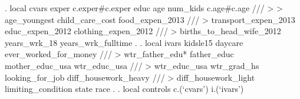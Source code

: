 . local cvars exper c.exper\#c.exper educ age num_kids c.age\#c.age         ///  
>    
>         age_youngest child_care_cost food_expen_2013                    ///
>         transport_expen_2013 educ_expen_2012 clothing_expen_2012        ///
>         births_to_head_wife_2012 years_wrk_18  years_wrk_fulltime 
{\smallskip}
. 
. local ivars kidsle15 daycare ever_worked_for_money                      ///
>         wtr_father_edu* father_educ mother_educ_usa wtr_educ_usa        ///
>         wtr_educ_usa wtr_grad_hs looking_for_job diff_housework_heavy   ///
>         diff_housework_light limiting_condition state race
{\smallskip}
. 
. local controls c.(`cvars') i.(`ivars')
{\smallskip}

